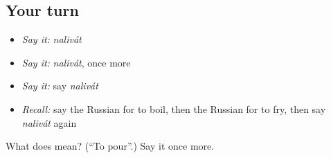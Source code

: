 \subsection*{Your turn}
\begin{itemize}
\raggedright
  \item \emph{Say it:} \emph{nalivát}
  \item \emph{Say it:} \emph{nalivát}, once more
  \item \emph{Say it:} say \emph{nalivát}
  \item \emph{Recall:} say the Russian for to boil, then the Russian for to fry, then say \emph{nalivát} again
\end{itemize}

\begin{tcolorbox}[breakable,colback=teal!4,colframe=teal!35!black,title={Before you move on}]
What does  mean? (\textquotedblleft{}To pour\textquotedblright{}.) Say it once more.
\end{tcolorbox}
